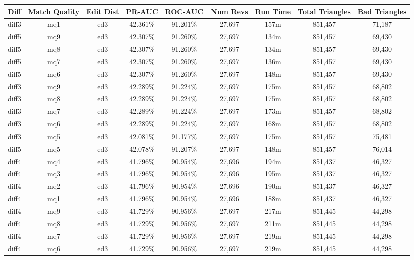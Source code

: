 \begin{sidewaystable}[!ph]
  \begin{center}
    \begin{tabular}{|c|c|c||c|c||c|c|c|c|}
\hline
Diff & Match Quality & Edit Dist
        & PR-AUC & ROC-AUC
        & Num Revs & Run Time
        & Total Triangles & Bad Triangles \\
\hline
\hline
diff3 & mq1 & ed3 & 42.361\% & 91.201\% & 27,697 & 157m & 851,457 & 71,187 \\
diff5 & mq9 & ed3 & 42.307\% & 91.260\% & 27,697 & 134m & 851,457 & 69,430 \\
diff5 & mq8 & ed3 & 42.307\% & 91.260\% & 27,697 & 134m & 851,457 & 69,430 \\
diff5 & mq7 & ed3 & 42.307\% & 91.260\% & 27,697 & 136m & 851,457 & 69,430 \\
diff5 & mq6 & ed3 & 42.307\% & 91.260\% & 27,697 & 148m & 851,457 & 69,430 \\
diff3 & mq9 & ed3 & 42.289\% & 91.224\% & 27,697 & 175m & 851,457 & 68,802 \\
diff3 & mq8 & ed3 & 42.289\% & 91.224\% & 27,697 & 175m & 851,457 & 68,802 \\
diff3 & mq7 & ed3 & 42.289\% & 91.224\% & 27,697 & 173m & 851,457 & 68,802 \\
diff3 & mq6 & ed3 & 42.289\% & 91.224\% & 27,697 & 168m & 851,457 & 68,802 \\
diff3 & mq5 & ed3 & 42.081\% & 91.177\% & 27,697 & 175m & 851,457 & 75,481 \\
diff5 & mq5 & ed3 & 42.078\% & 91.207\% & 27,697 & 148m & 851,457 & 76,014 \\
diff4 & mq4 & ed3 & 41.796\% & 90.954\% & 27,696 & 194m & 851,437 & 46,327 \\
diff4 & mq3 & ed3 & 41.796\% & 90.954\% & 27,696 & 195m & 851,437 & 46,327 \\
diff4 & mq2 & ed3 & 41.796\% & 90.954\% & 27,696 & 190m & 851,437 & 46,327 \\
diff4 & mq1 & ed3 & 41.796\% & 90.954\% & 27,696 & 188m & 851,437 & 46,327 \\
diff4 & mq9 & ed3 & 41.729\% & 90.956\% & 27,697 & 217m & 851,445 & 44,298 \\
diff4 & mq8 & ed3 & 41.729\% & 90.956\% & 27,697 & 211m & 851,445 & 44,298 \\
diff4 & mq7 & ed3 & 41.729\% & 90.956\% & 27,697 & 219m & 851,445 & 44,298 \\
diff4 & mq6 & ed3 & 41.729\% & 90.956\% & 27,697 & 219m & 851,445 & 44,298 \\

\end{tabular}
\end{center}
\end{sidewaystable}
